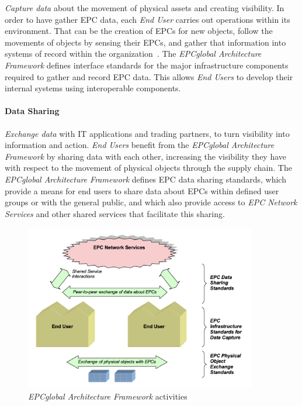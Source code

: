 \emph{Capture data} about the movement of physical assets and creating visibility.
In order to have gather \gls{EPC} data, each \emph{End User} carries out operations within its environment. That can be the creation of \gls{EPC}s for new objects, follow the movements of objects by sensing their \gls{EPC}s, and gather that information into systems of record within the organization~\cite{Architecture6framework20140414Pdf}. The \emph{EPCglobal Architecture Framework} defines interface standards for the major infrastructure components required to gather and record \gls{EPC} data. This allows \emph{End Users} to develop their internal systems using interoperable components.

\paragraph{Data Sharing} 

\emph{Exchange data} with \gls{IT} applications and trading partners, to turn visibility into information and action.
\emph{End Users} benefit from the \emph{EPCglobal Architecture Framework} by sharing data with each other, increasing the visibility they have with respect to the movement of physical objects through the \gls{supply chain}. 
The \emph{EPCglobal Architecture Framework} defines \gls{EPC} data sharing standards, which provide a means for end users to share data about \gls{EPC}s within defined user groups or with the general public, and which also provide access to \emph{EPC Network Services} and other shared services that facilitate this sharing. 

\begin{figure}[!ht]
    \centering
    \includegraphics[width=0.9\textwidth]{./assets/02-state-of-the-art/architecture-framework-activities.png}
    \caption{\emph{EPCglobal Architecture Framework} activities~\cite{Architecture6framework20140414Pdf}} 
    \label{fig:02:architecture-activities}
\end{figure}

